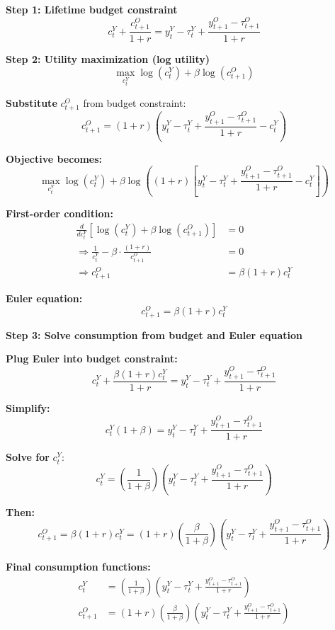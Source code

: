 \documentclass[12pt]{article}
\begin{document}
{\color{blue}
\textbf{Step 1: Lifetime budget constraint}
\[
c_t^Y + \frac{c_{t+1}^O}{1 + r} = y_t^Y - \tau_t^Y + \frac{y_{t+1}^O - \tau_{t+1}^O}{1 + r}
\]

\textbf{Step 2: Utility maximization (log utility)}
\[
\max_{c_t^Y} \log(c_t^Y) + \beta \log(c_{t+1}^O)
\]

\textbf{Substitute } \( c_{t+1}^O \) from budget constraint:
\[
c_{t+1}^O = (1 + r)\left(y_t^Y - \tau_t^Y + \frac{y_{t+1}^O - \tau_{t+1}^O}{1 + r} - c_t^Y\right)
\]

\textbf{Objective becomes:}
\[
\max_{c_t^Y} \log(c_t^Y) + \beta \log\left( (1 + r)\left[ y_t^Y - \tau_t^Y + \frac{y_{t+1}^O - \tau_{t+1}^O}{1 + r} - c_t^Y \right] \right)
\]

\textbf{First-order condition:}
\begin{align*}
\frac{d}{dc_t^Y} \left[ \log(c_t^Y) + \beta \log(c_{t+1}^O) \right] &= 0 \\
\Rightarrow \frac{1}{c_t^Y} - \beta \cdot \frac{(1 + r)}{c_{t+1}^O} &= 0 \\
\Rightarrow c_{t+1}^O &= \beta (1 + r) c_t^Y
\end{align*}

\textbf{Euler equation:}
\[
c_{t+1}^O = \beta (1 + r) c_t^Y \tag{Euler}
\]

\textbf{Step 3: Solve consumption from budget and Euler equation}

\textbf{Plug Euler into budget constraint:}
\[
c_t^Y + \frac{\beta (1 + r) c_t^Y}{1 + r} = y_t^Y - \tau_t^Y + \frac{y_{t+1}^O - \tau_{t+1}^O}{1 + r}
\]

\textbf{Simplify:}
\[
c_t^Y (1 + \beta) = y_t^Y - \tau_t^Y + \frac{y_{t+1}^O - \tau_{t+1}^O}{1 + r}
\]

\textbf{Solve for } \( c_t^Y \):
\[
c_t^Y = \left( \frac{1}{1 + \beta} \right) \left( y_t^Y - \tau_t^Y + \frac{y_{t+1}^O - \tau_{t+1}^O}{1 + r} \right)
\]

\textbf{Then:}
\[
c_{t+1}^O = \beta (1 + r) c_t^Y
= (1 + r) \left( \frac{\beta}{1 + \beta} \right) \left( y_t^Y - \tau_t^Y + \frac{y_{t+1}^O - \tau_{t+1}^O}{1 + r} \right)
\]

\textbf{Final consumption functions:}
\begin{align*}
c_t^Y &= \left( \frac{1}{1 + \beta} \right) \left( y_t^Y - \tau_t^Y + \frac{y_{t+1}^O - \tau_{t+1}^O}{1 + r} \right) \tag{17} \\
c_{t+1}^O &= (1 + r) \left( \frac{\beta}{1 + \beta} \right) \left( y_t^Y - \tau_t^Y + \frac{y_{t+1}^O - \tau_{t+1}^O}{1 + r} \right) \tag{18}
\end{align*}

}
\end{document}

